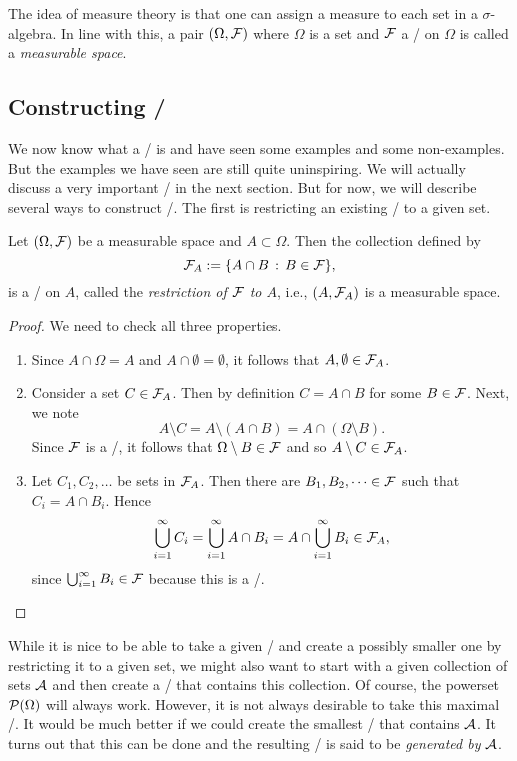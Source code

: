 \medskip

The idea of measure theory is that one can assign a measure to each set in a $\sigma$-algebra. In line with this, a pair $(\Omega, \mathcal F)$ where $\Omega$ is a set and $\mathcal F$ a \sigalg/ on $\Omega$ is called a \emph{measurable space}. 

\subsection{Constructing \sigalgs/}\label{ssec:construction_sigalgs}

We now know what a \sigalg/ is and have seen some examples and some non-examples. But the examples we have seen are still quite uninspiring. We will actually discuss a very important \sigalg/ in the next section. But for now, we will describe several ways to construct \sigalgs/. The first is restricting an existing \sigalg/ to a given set.

\begin{lemma}\label{lem:restriction_sigma_algebra}
Let $(\Omega, \mathcal F)$ be a measurable space and $A \subset \Omega$. Then the collection defined by 
\[
	\mathcal F_A := \{A \cap B \, : \, B \in \mathcal F\},
\]
is a \sigalg/ on $A$, called the \emph{restriction of $\mathcal F$ to $A$}, i.e., $(A,\mathcal F_A)$ is a measurable space.
\end{lemma}

\begin{proof}
We need to check all three properties.
\begin{enumerate}
\item Since $A \cap \Omega = A$ and $A \cap \emptyset = \emptyset$, it follows that $A, \emptyset \in \mathcal F_A$.
\item Consider a set $C \in \mathcal F_A$. Then by definition $C = A \cap B$ for some $B \in \mathcal F$. Next, we note
\[
	A \setminus C = A \setminus (A \cap B) = A \cap (\Omega \setminus B).
\]
Since $\mathcal F$ is a \sigalg/, it follows that $\Omega \setminus B \in \mathcal F$ and so $A \setminus C \in \mathcal F_A$.
\item Let $C_1, C_2, \dots$ be sets in $\mathcal F_A$. Then there are $B_1, B_2, \dots \in \mathcal F$ such that $C_i = A \cap B_i$. Hence
\[
	\bigcup_{i=1}^\infty C_i = \bigcup_{i=1}^\infty A \cap B_i = A \cap \bigcup_{i=1}^\infty B_i \in \mathcal F_A,
\]
since $\bigcup_{i=1}^\infty B_i \in \mathcal F$ because this is a \sigalg/. \qedhere
\end{enumerate}
\end{proof}

While it is nice to be able to take a given \sigalg/ and create a possibly smaller one by restricting it to a given set, we might also want to start with a given collection of sets $\mathcal A$ and then create a \sigalg/ that contains this collection. Of course, the powerset $\mathcal P(\Omega)$ will always work. However, it is not always desirable to take this maximal \sigalg/. It would be much better if we could create the smallest \sigalg/ that contains $\mathcal A$. It turns out that this can be done and the resulting \sigalg/ is said to be \emph{generated by $\mathcal A$}. 

